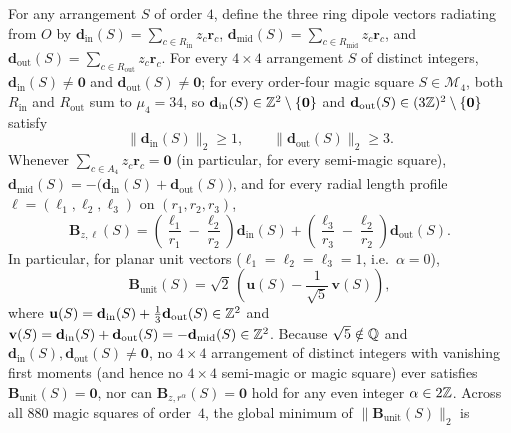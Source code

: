 \begin{theorem}
\label{thm:three-ring}
For any arrangement $S$ of order $4$, define the three ring dipole vectors radiating from $O$ by $\mathbf d_{\mathrm{in}}(S)=\sum_{c\in R_{\mathrm{in}}}z_c\mathbf r_c$, $\mathbf d_{\mathrm{mid}}(S)=\sum_{c\in R_{\mathrm{mid}}}z_c\mathbf r_c$, and $\mathbf d_{\mathrm{out}}(S)=\sum_{c\in R_{\mathrm{out}}}z_c\mathbf r_c$. For every $4\times4$ arrangement $S$ of distinct integers, $\mathbf d_{\mathrm{in}}(S)\ne\mathbf 0$ and $\mathbf d_{\mathrm{out}}(S)\ne\mathbf 0$; for every order-four magic square $S\in\mathcal M_4$, both $R_{\mathrm{in}}$ and $R_{\mathrm{out}}$ sum to $\mu_4=34$, so $\mathbf d_{\mathrm{in}}(S)\in\mathbb{Z}^2\setminus\{\mathbf 0\}$ and $\mathbf d_{\mathrm{out}}(S)\in(3\mathbb{Z})^2\setminus\{\mathbf 0\}$ satisfy
\begin{equation}
\label{eq:ring-lower}
\|\mathbf d_{\mathrm{in}}(S)\|_2 \ge 1,\qquad \|\mathbf d_{\mathrm{out}}(S)\|_2 \ge 3.
\end{equation}
Whenever $\sum_{c\in A_4}z_c\mathbf r_c=\mathbf 0$ (in particular, for every semi-magic square), $\mathbf d_{\mathrm{mid}}(S)=-\bigl(\mathbf d_{\mathrm{in}}(S)+\mathbf d_{\mathrm{out}}(S)\bigr)$, and for every radial length profile $\ell=(\ell_1,\ell_2,\ell_3)$ on $(r_1,r_2,r_3)$,
\begin{equation}
\label{eq:three-ring-general}
\mathbf B_{z,\ell}(S) = \left(\frac{\ell_1}{r_1} - \frac{\ell_2}{r_2}\right)\mathbf d_{\mathrm{in}}(S)
+ \left(\frac{\ell_3}{r_3} - \frac{\ell_2}{r_2}\right)\mathbf d_{\mathrm{out}}(S).
\end{equation}
In particular, for planar unit vectors ($\ell_1=\ell_2=\ell_3=1$, i.e.\ $\alpha=0$),
\begin{equation}
\label{eq:unit-uv}
\mathbf B_{\mathrm{unit}}(S) = \sqrt{2}\,\left(\mathbf u(S) - \frac{1}{\sqrt{5}}\,\mathbf v(S)\right),
\end{equation}
where $\mathbf u(S)=\mathbf d_{\mathrm{in}}(S)+\frac13\mathbf d_{\mathrm{out}}(S)\in\mathbb{Z}^2$ and $\mathbf v(S)=\mathbf d_{\mathrm{in}}(S)+\mathbf d_{\mathrm{out}}(S)=-\mathbf d_{\mathrm{mid}}(S)\in\mathbb{Z}^2$. Because $\sqrt{5}\notin\mathbb{Q}$ and $\mathbf d_{\mathrm{in}}(S),\mathbf d_{\mathrm{out}}(S)\ne\mathbf 0$, no $4\times4$ arrangement of distinct integers with vanishing first moments (and hence no $4\times4$ semi-magic or magic square) ever satisfies $\mathbf B_{\mathrm{unit}}(S)=\mathbf 0$, nor can $\mathbf B_{z,r^\alpha}(S)=\mathbf 0$ hold for any even integer $\alpha\in2\mathbb{Z}$. Across all $880$ magic squares of order~$4$, the global minimum of $\|\mathbf B_{\mathrm{unit}}(S)\|_2$ is

\end{theorem}
